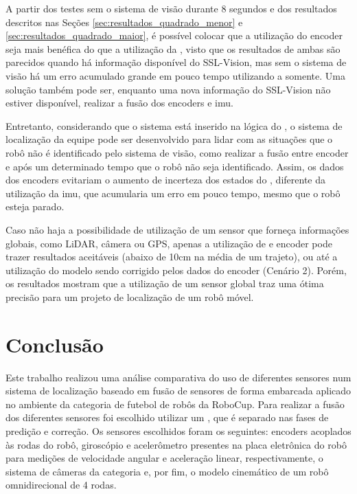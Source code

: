 \documentclass[acronym, symbols, table, deposito]{fei}
\begin{document}
		A partir dos testes sem o sistema de visão durante 8 segundos e dos resultados descritos nas Seções \ref{sec:resultados_quadrado_menor} e \ref{sec:resultados_quadrado_maior}, é possível colocar que a utilização do encoder seja mais benéfica do que a utilização da , visto que os resultados de ambas são parecidos quando há informação disponível do SSL-Vision, mas sem o sistema de visão há um erro acumulado grande em pouco tempo utilizando a  somente. Uma solução também pode ser, enquanto uma nova informação do SSL-Vision não estiver disponível, realizar a fusão dos encoders e \acrshort{imu}.
		
		Entretanto, considerando que o sistema está inserido na lógica do , o sistema de localização da equipe pode ser desenvolvido para lidar com as situações que o robô não é identificado pelo sistema de visão, como realizar a fusão entre encoder e  após um determinado tempo que o robô não seja identificado. Assim, os dados dos encoders evitariam o aumento de incerteza dos estados do , diferente da utilização da \acrshort{imu}, que acumularia um erro em pouco tempo, mesmo que o robô esteja parado.
		
		Caso não haja a possibilidade de utilização de um sensor que forneça informações globais, como LiDAR, câmera ou GPS, apenas a utilização de  e encoder pode trazer resultados aceitáveis (abaixo de 10cm na média de um trajeto), ou até a utilização do modelo sendo corrigido pelos dados do encoder (Cenário 2). Porém, os resultados mostram que a utilização de um sensor global traz uma ótima precisão para um projeto de localização de um robô móvel.

\chapter{Conclusão} \label{sec:conclusao}

	Este trabalho realizou uma análise comparativa do uso de diferentes sensores num sistema de localização baseado em fusão de sensores de forma embarcada aplicado no ambiente da categoria  de futebol de robôs da RoboCup. Para realizar a fusão dos diferentes sensores foi escolhido utilizar um , que é separado nas fases de predição e correção. Os sensores escolhidos foram os seguintes: encoders acoplados às rodas do robô, giroscópio e acelerômetro presentes na placa eletrônica do robô para medições de velocidade angular e aceleração linear, respectivamente, o sistema de câmeras da categoria  e, por fim, o modelo cinemático de um robô omnidirecional de 4 rodas.
	
\end{document}
